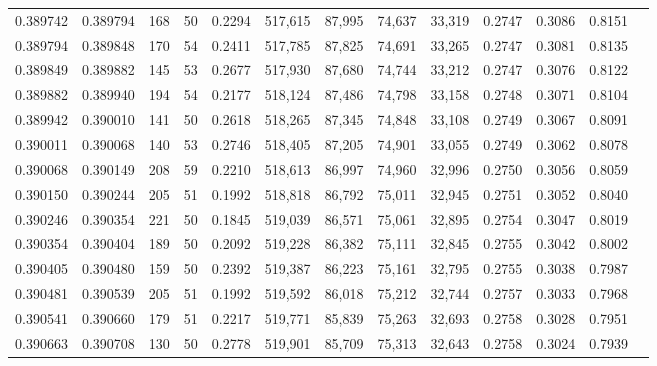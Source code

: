 \begin{tabular}{rrrrrrrrrrrrr}
0.389742 & 0.389794 &   168 &  50 &                                     0.2294 & 517,615 &  87,995 &  74,637 &  33,319 & 0.2747 & 0.3086 & 0.8151 \\
0.389794 & 0.389848 &   170 &  54 &                                     0.2411 & 517,785 &  87,825 &  74,691 &  33,265 & 0.2747 & 0.3081 & 0.8135 \\
0.389849 & 0.389882 &   145 &  53 &                                     0.2677 & 517,930 &  87,680 &  74,744 &  33,212 & 0.2747 & 0.3076 & 0.8122 \\
0.389882 & 0.389940 &   194 &  54 &                                     0.2177 & 518,124 &  87,486 &  74,798 &  33,158 & 0.2748 & 0.3071 & 0.8104 \\
0.389942 & 0.390010 &   141 &  50 &                                     0.2618 & 518,265 &  87,345 &  74,848 &  33,108 & 0.2749 & 0.3067 & 0.8091 \\
0.390011 & 0.390068 &   140 &  53 &                                     0.2746 & 518,405 &  87,205 &  74,901 &  33,055 & 0.2749 & 0.3062 & 0.8078 \\
0.390068 & 0.390149 &   208 &  59 &                                     0.2210 & 518,613 &  86,997 &  74,960 &  32,996 & 0.2750 & 0.3056 & 0.8059 \\
0.390150 & 0.390244 &   205 &  51 &                                     0.1992 & 518,818 &  86,792 &  75,011 &  32,945 & 0.2751 & 0.3052 & 0.8040 \\
0.390246 & 0.390354 &   221 &  50 &                                     0.1845 & 519,039 &  86,571 &  75,061 &  32,895 & 0.2754 & 0.3047 & 0.8019 \\
0.390354 & 0.390404 &   189 &  50 &                                     0.2092 & 519,228 &  86,382 &  75,111 &  32,845 & 0.2755 & 0.3042 & 0.8002 \\
0.390405 & 0.390480 &   159 &  50 &                                     0.2392 & 519,387 &  86,223 &  75,161 &  32,795 & 0.2755 & 0.3038 & 0.7987 \\
0.390481 & 0.390539 &   205 &  51 &                                     0.1992 & 519,592 &  86,018 &  75,212 &  32,744 & 0.2757 & 0.3033 & 0.7968 \\
0.390541 & 0.390660 &   179 &  51 &                                     0.2217 & 519,771 &  85,839 &  75,263 &  32,693 & 0.2758 & 0.3028 & 0.7951 \\
0.390663 & 0.390708 &   130 &  50 &                                     0.2778 & 519,901 &  85,709 &  75,313 &  32,643 & 0.2758 & 0.3024 & 0.7939 \\

\end{tabular}
